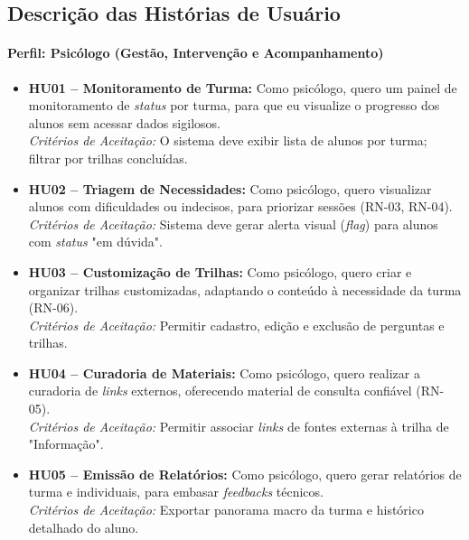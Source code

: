 \subsection{Descrição das Histórias de Usuário}

\paragraph{Perfil: Psicólogo (Gestão, Intervenção e Acompanhamento)}

\begin{itemize}
    \item \textbf{HU01 -- Monitoramento de Turma:} Como psicólogo, quero um painel de monitoramento de \textit{status} por turma, para que eu visualize o progresso dos alunos sem acessar dados sigilosos. \\
    \textit{Critérios de Aceitação:} O sistema deve exibir lista de alunos por turma; filtrar por trilhas concluídas.

    \item \textbf{HU02 -- Triagem de Necessidades:} Como psicólogo, quero visualizar alunos com dificuldades ou indecisos, para priorizar sessões (RN-03, RN-04). \\
    \textit{Critérios de Aceitação:} Sistema deve gerar alerta visual (\textit{flag}) para alunos com \textit{status} "em dúvida".

    \item \textbf{HU03 -- Customização de Trilhas:} Como psicólogo, quero criar e organizar trilhas customizadas, adaptando o conteúdo à necessidade da turma (RN-06). \\
    \textit{Critérios de Aceitação:} Permitir cadastro, edição e exclusão de perguntas e trilhas.

    \item \textbf{HU04 -- Curadoria de Materiais:} Como psicólogo, quero realizar a curadoria de \textit{links} externos, oferecendo material de consulta confiável (RN-05). \\
    \textit{Critérios de Aceitação:} Permitir associar \textit{links} de fontes externas à trilha de "Informação".

    \item \textbf{HU05 -- Emissão de Relatórios:} Como psicólogo, quero gerar relatórios de turma e individuais, para embasar \textit{feedbacks} técnicos. \\
    \textit{Critérios de Aceitação:} Exportar panorama macro da turma e histórico detalhado do aluno.


\end{itemize}
